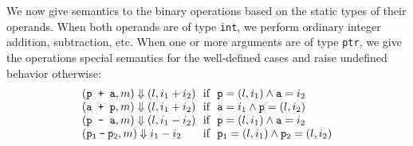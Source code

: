 We now give semantics to the binary operations based on the static types of their operands. 
When both operands are of type \texttt{int}, we perform ordinary integer addition, subtraction, etc. 
When one or more arguments are of type \texttt{ptr}, we give the operations special semantics for the well-defined cases
and raise undefined behavior otherwise: %
\[
\begin{array}{@{}l@{~}l@{}}
(\texttt{p + a}, m) \Downarrow (l, i_1 + i_2) & \text{ if }~ \texttt{p} = (l, i_1) \land \texttt{a} = i_2\\
(\texttt{a + p}, m) \Downarrow (l, i_1 + i_2) & \text{ if }~ \texttt{a} = i_1 \land \texttt{p} = (l, i_2)\\
(\texttt{p - a}, m) \Downarrow (l, i_1 - i_2) & \text{ if }~ \texttt{p} = (l, i_1) \land \texttt{a} = i_2\\
(\mathtt{p_1 \mathbin{\texttt{-}} p_2}, m) \Downarrow i_1 - i_2 & \text{ if }~ \mathtt{p_1} = (l, i_1) \land \mathtt{p_2} = (l, i_2)\\

\end{array}\]
